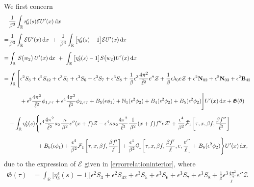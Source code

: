 \documentclass[10pt, reqno]{amsart}
\numberwithin{equation}{section}
\theoremstyle{definition}
\begin{document}
{We first concern
\begin{align*}
& \frac{1}{\beta^3}\int_{\mathbb R}\eta_\delta^\epsilon(s){\mathcal E}U'(x) \,{\mathrm d}x
\nonumber\\[2mm]
=&\frac{1}{\beta^3}\int_{\mathbb R} {\mathcal E}U'(x) \,{\mathrm d}x
\ +\
\frac{1}{\beta^3}\int_{\mathbb R} \big[\eta_\delta^\epsilon(s)-1\big]{\mathcal E}U'(x) \,{\mathrm d}x
\nonumber\\[2mm]
=& \int_{{\mathbb R}}\, S\big(w_2\big)\, U'(x) \,{\mathrm d}x
\ +\
\int_{\mathbb R} \big[\eta_\delta^\epsilon(s)-1\big]S\big(w_2\big)U'(x) \,{\mathrm d}x
\nonumber\\[2mm]
=&
\int_{\mathbb R} \Bigg[\epsilon^2 S_{3} + \epsilon^2 S_{42} + \epsilon^3 S_{5} +\epsilon^3 S_{6}
 +\epsilon^3 S_{7} +\epsilon^3 S_{8}
 +\frac 1\beta\epsilon^3\frac{4\pi^2}{{\tilde\ell}^2} e''\mathcal Z
 +\frac 1\beta \epsilon\lambda_0 e{\mathcal Z}
 +\epsilon^2 {\bf N}_{02}
  +\epsilon^2 {\bf N}_{03}
 + \epsilon^2 {\bf B}_{42}
\nonumber\\[2mm]
&\qquad
 + \epsilon^3 \frac{4\pi^2}{{\tilde\ell}^2} {\phi}_{1, \tau\tau}
+ \epsilon^4 \frac{4\pi^2}{{\tilde\ell}^2}\phi_{2, \tau\tau}
+B_{5}(\epsilon\phi_1) + \mathbb{N}_1 (\epsilon^2 \phi_2)
+ B_4(\epsilon^2\phi_2)+ B_5 (\epsilon^2{\phi_2}) \Bigg]U'(x) \,{\mathrm d}x + \mathfrak G(\theta)
\nonumber\\[2mm]
&
 +\int_{\mathbb R} \eta_\delta^\epsilon(s) \Bigg\{\epsilon^4 \frac{4\pi^2} {{\tilde\ell}^2} a_2\frac{\kappa}{\, \beta^2\, } e'' (x+f)\mathcal Z -\epsilon^4 \kappa a_2 \frac{ 4\pi^2} {{\tilde\ell}^2} \frac{1}{\, \beta^2\, } (x+f) f'' e \mathcal Z' + \frac{\epsilon^4}{\beta^2} \hat{\mathcal F}_1\left[\tau, x, \beta f, \frac{\beta f''}{\tilde\ell^2} \right]
\nonumber\\[2mm]
&\qquad\qquad\quad
+B_{6}(\epsilon\phi_1)
 + \frac{\epsilon^4}{\beta^2} \mathcal F_1\left[\tau, x, \beta f, \frac{\beta f'}{\tilde\ell}\right]
 +\frac{\epsilon^4} {\beta^2} \mathcal G_1\left[\tau, x, \beta f, \frac{\beta f'}{\tilde\ell}, e, \frac{e'}{\tilde\ell}\right]
 + B_6 (\epsilon^2{\phi_2}) \Bigg\}  U'(x) \,{\mathrm d}x,
\end{align*}
due to the expression of $\mathcal{E}$ given in \eqref{errorrelationinterior},
where
\begin{align*}
 \mathfrak G(\tau) & = \int_{\mathbb R}\big[\eta_\delta^\epsilon(s)-1\big] \Bigg[\epsilon^2 S_{3} + \epsilon^2 S_{42} + \epsilon^3 S_{5} +\epsilon^3 S_{6}
 +\epsilon^3 S_{7} +\epsilon^3 S_{8}
 +\frac 1\beta\epsilon^3\frac{4\pi^2}{{\tilde\ell}^2} e''\mathcal Z
 \nonumber\\[2mm]

\end{align*}}
\end{document}
